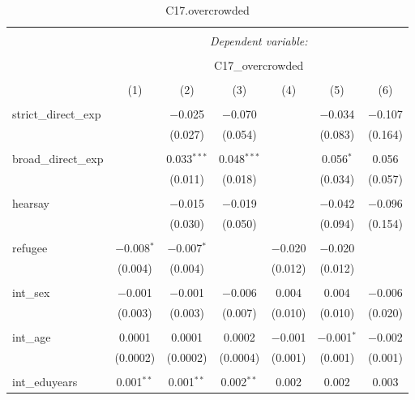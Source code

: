 
\begin{table}[H] \centering 
  \caption{C17.overcrowded} 
  \label{} 
\tiny 
\begin{tabular}{@{\extracolsep{4pt}}lcccccc} 
\\[-1.8ex]\hline 
\hline \\[-1.8ex] 
 & \multicolumn{6}{c}{\textit{Dependent variable:}} \\ 
\cline{2-7} 
\\[-1.8ex] & \multicolumn{6}{c}{C17\_overcrowded} \\ 
\\[-1.8ex] & (1) & (2) & (3) & (4) & (5) & (6)\\ 
\hline \\[-1.8ex] 
 strict\_direct\_exp &  & $-$0.025 & $-$0.070 &  & $-$0.034 & $-$0.107 \\ 
  &  & (0.027) & (0.054) &  & (0.083) & (0.164) \\ 
  & & & & & & \\ 
 broad\_direct\_exp &  & 0.033$^{***}$ & 0.048$^{***}$ &  & 0.056$^{*}$ & 0.056 \\ 
  &  & (0.011) & (0.018) &  & (0.034) & (0.057) \\ 
  & & & & & & \\ 
 hearsay &  & $-$0.015 & $-$0.019 &  & $-$0.042 & $-$0.096 \\ 
  &  & (0.030) & (0.050) &  & (0.094) & (0.154) \\ 
  & & & & & & \\ 
 refugee & $-$0.008$^{*}$ & $-$0.007$^{*}$ &  & $-$0.020 & $-$0.020 &  \\ 
  & (0.004) & (0.004) &  & (0.012) & (0.012) &  \\ 
  & & & & & & \\ 
 int\_sex & $-$0.001 & $-$0.001 & $-$0.006 & 0.004 & 0.004 & $-$0.006 \\ 
  & (0.003) & (0.003) & (0.007) & (0.010) & (0.010) & (0.020) \\ 
  & & & & & & \\ 
 int\_age & 0.0001 & 0.0001 & 0.0002 & $-$0.001 & $-$0.001$^{*}$ & $-$0.002 \\ 
  & (0.0002) & (0.0002) & (0.0004) & (0.001) & (0.001) & (0.001) \\ 
  & & & & & & \\ 
 int\_eduyears & 0.001$^{**}$ & 0.001$^{**}$ & 0.002$^{**}$ & 0.002 & 0.002 & 0.003 \\ 

\end{tabular}
\end{table}
